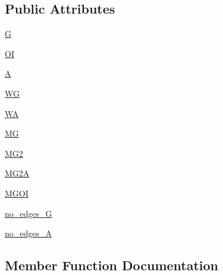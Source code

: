 \subsection*{Public Attributes}
\begin{DoxyCompactItemize}
\item 
\hyperlink{classnetworkx_1_1linalg_1_1tests_1_1test__graphmatrix_1_1TestGraphMatrix_a1842b5d84d9d024428483e2275b8fdb9}{G}
\item 
\hyperlink{classnetworkx_1_1linalg_1_1tests_1_1test__graphmatrix_1_1TestGraphMatrix_a0a6557d6d17c0dfade5b701dc30db52b}{OI}
\item 
\hyperlink{classnetworkx_1_1linalg_1_1tests_1_1test__graphmatrix_1_1TestGraphMatrix_aaa042d0f8f59c2ed37d93e516dbffbb2}{A}
\item 
\hyperlink{classnetworkx_1_1linalg_1_1tests_1_1test__graphmatrix_1_1TestGraphMatrix_aa39750530a4e4015bcfd288e151db85f}{WG}
\item 
\hyperlink{classnetworkx_1_1linalg_1_1tests_1_1test__graphmatrix_1_1TestGraphMatrix_a1a8c7ae90410ab52765a181de97a5f41}{WA}
\item 
\hyperlink{classnetworkx_1_1linalg_1_1tests_1_1test__graphmatrix_1_1TestGraphMatrix_a5fb27783a8ae4a1dd54f9cd22f6c2756}{MG}
\item 
\hyperlink{classnetworkx_1_1linalg_1_1tests_1_1test__graphmatrix_1_1TestGraphMatrix_a9005e6b62f3232013d51cb132bbd510d}{M\+G2}
\item 
\hyperlink{classnetworkx_1_1linalg_1_1tests_1_1test__graphmatrix_1_1TestGraphMatrix_a8d3e486ef894e09fc2729ff07f0f6dfb}{M\+G2A}
\item 
\hyperlink{classnetworkx_1_1linalg_1_1tests_1_1test__graphmatrix_1_1TestGraphMatrix_afceed6421916b534acf358aa79237715}{M\+G\+OI}
\item 
\hyperlink{classnetworkx_1_1linalg_1_1tests_1_1test__graphmatrix_1_1TestGraphMatrix_a867bfbd182486a75d68ec5e2e67a3f3e}{no\+\_\+edges\+\_\+G}
\item 
\hyperlink{classnetworkx_1_1linalg_1_1tests_1_1test__graphmatrix_1_1TestGraphMatrix_a24fb8fc3ca5813f846ca91fb711cf1aa}{no\+\_\+edges\+\_\+A}
\end{DoxyCompactItemize}


\subsection{Member Function Documentation}
\mbox{\label{classnetworkx_1_1linalg_1_1tests_1_1test__graphmatrix_1_1TestGraphMatrix_ac0e14177b3f6cdd8d5eb6391e5b853b8}} 
